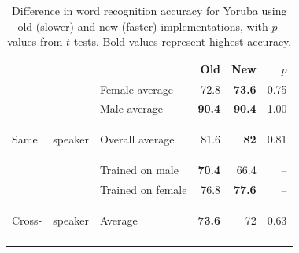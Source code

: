 \documentclass[11pt]{article}
\begin{document}
\begin{table}[tb]
\begin{center}
\begin{tabularx}{\columnwidth}{p{1mm} p{3mm} l r r r}
\hline
 & & & Old & New & $p$\\
\hline
\noalign{\smallskip}


& & Female  average & 72.8 & \textbf{73.6} & 0.75 \\
& & Male  average & \textbf{90.4} & \textbf{90.4} & 1.00\\
\multirow{-3}{*}{\begin{sideways} Same \end{sideways}}& \multirow{-3}{*}{\begin{sideways} speaker \end{sideways}}& Overall average & 81.6 & \textbf{82} & 0.81 \\

\noalign{\smallskip}
\hline
\noalign{\smallskip}

&& Trained on male& \textbf{70.4} & 66.4 & --\\
&& Trained on female & 76.8 & \textbf{77.6} & --\\
\multirow{-3}{*}{\begin{sideways}{ Cross-}\end{sideways}}&\multirow{-3}{*}{\begin{sideways}{ speaker}\end{sideways}}& Average & \textbf{73.6} & 72 & 0.63\\

\noalign{\smallskip}
\hline
\end{tabularx}
\end{center}
\caption{Difference in word recognition accuracy for Yoruba 
using old (slower) and new (faster) implementations, with $p$-values from 
$t$-tests. Bold values represent highest accuracy. \label{tab:accuracy}}
\end{table}
\end{document}
